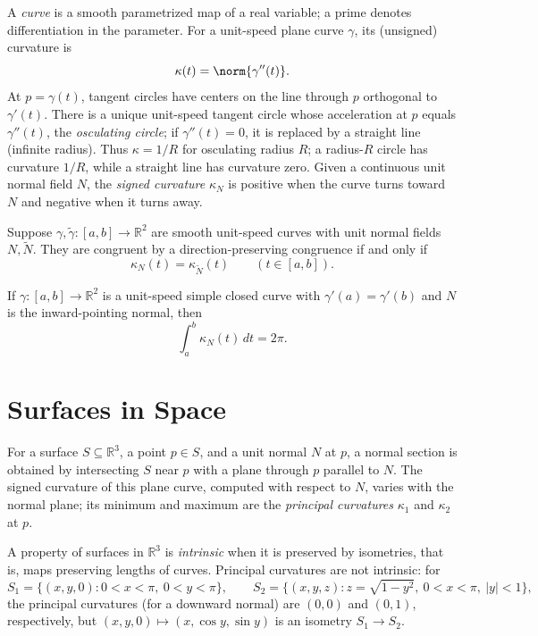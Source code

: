 A \emph{curve} is a smooth parametrized map of a real variable; a prime denotes differentiation in
the parameter. For a unit-speed plane curve $\gamma$, its (unsigned) curvature is
\[
\kappa(t)=\norm{\gamma''(t)}.
\]
At $p=\gamma(t)$, tangent circles have centers on the line through $p$ orthogonal to $\gamma'(t)$.
There is a unique unit-speed tangent circle whose acceleration at $p$ equals $\gamma''(t)$, the
\emph{osculating circle}; if $\gamma''(t)=0$, it is replaced by a straight line (infinite radius).
Thus $\kappa=1/R$ for osculating radius $R$; a radius-$R$ circle has curvature $1/R$, while a
straight line has curvature zero. Given a continuous unit normal field $N$, the \emph{signed curvature}
$\kappa_N$ is positive when the curve turns toward $N$ and negative when it turns away.

\begin{theorem}
\label{thm:plane-curve-classification}


Suppose $\gamma,\widetilde\gamma\colon[a,b]\to\mathbb R^2$ are smooth unit-speed curves with unit
normal fields $N,\widetilde N$. They are congruent by a direction-preserving congruence if and only if
\[
\kappa_N(t)=\kappa_{\widetilde N}(t)\qquad(t\in[a,b]).
\]
\end{theorem}

\begin{theorem}
\label{thm:total-curvature}


If $\gamma\colon[a,b]\to\mathbb R^2$ is a unit-speed simple closed curve with
$\gamma'(a)=\gamma'(b)$ and $N$ is the inward-pointing normal, then
\[
\int_a^b\kappa_N(t)\,dt=2\pi.
\]
\end{theorem}

\section{Surfaces in Space}

For a surface $S\subseteq\mathbb R^3$, a point $p\in S$, and a unit normal $N$ at $p$, a normal
section is obtained by intersecting $S$ near $p$ with a plane through $p$ parallel to $N$. The signed
curvature of this plane curve, computed with respect to $N$, varies with the normal plane; its minimum
and maximum are the \emph{principal curvatures} $\kappa_1$ and $\kappa_2$ at $p$.

A property of surfaces in $\mathbb R^3$ is \emph{intrinsic} when it is preserved by isometries,
that is, maps preserving lengths of curves. Principal curvatures are not intrinsic: for
\[
S_1=\{(x,y,0):0<x<\pi,\ 0<y<\pi\},\qquad
S_2=\{(x,y,z):z=\sqrt{1-y^2},\ 0<x<\pi,\ |y|<1\},
\]
the principal curvatures (for a downward normal) are $(0,0)$ and $(0,1)$, respectively, but
$(x,y,0)\mapsto(x,\cos y,\sin y)$ is an isometry $S_1\to S_2$.

